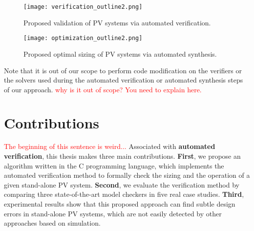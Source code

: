 \begin{figure}[h]
\texttt{[image: verification\_outline2.png]}
\centering
\caption{Proposed validation of PV systems via automated verification.}
\label{fig:validation_outline} 
\end{figure}


\begin{figure}[h]
\texttt{[image: optimization\_outline2.png]}
\centering
\caption{Proposed optimal sizing of PV systems via automated synthesis.}
\label{fig:optimization_outline} 
\end{figure}

Note that it is out of our scope to perform code modification on the verifiers or the solvers used during the automated verification or automated synthesis steps of our approach. \textcolor{red}{why is it out of scope? You need to explain here.}

\section{Contributions}


\textcolor{red}{The beginning of this sentence is weird...}
Associated with \textbf{automated verification}, this thesis makes three main contributions. 
\textbf{First}, we propose an algorithm written in the C programming language, which implements the automated verification method to formally check the sizing and the operation of a given stand-alone PV system. 
\textbf{Second}, we evaluate the verification method by comparing three state-of-the-art model checkers in five real case studies. 
\textbf{Third}, experimental results show that this proposed approach can find subtle design errors in stand-alone PV systems, which are not easily detected by other approaches based on simulation. 
%

